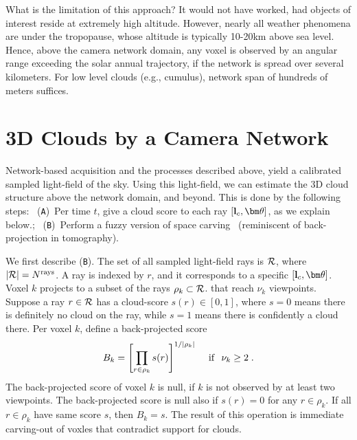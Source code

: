 \documentclass[runningheads]{llncs}
\begin{document}
What is the limitation of this approach? It would not have worked, had objects of interest reside at extremely high altitude. However, nearly all weather phenomena are under the tropopause, whose altitude is typically 10-20km above sea level. Hence, above the camera network domain, any voxel is observed by an angular range exceeding the solar annual trajectory, if the network is spread over several kilometers. For low level clouds (e.g., cumulus), network span of hundreds of meters suffices.


\section{3D Clouds by a Camera Network}
\label{sec:mutiradio}

Network-based acquisition and the processes described above, yield a calibrated sampled light-field of the sky. Using this light-field, we can estimate the 3D cloud structure above the network domain, and beyond. This is done by the following steps:~ %
({\tt A})~Per time $t$, give a {\rm cloud score} to each ray $[{\bf l}_c,{\bm \theta}]$, as we explain below.;~ ({\tt B})~Perform a fuzzy version of space carving~\cite{Kutulakos2000} (reminiscent of back-projection in tomography).

We first describe ({\tt B}).  The set of all sampled light-field rays is ${\cal R}$, where
\mbox{$|{\cal R}|=N^{\rm rays}$}. A ray is indexed by $r$, and it corresponds to a specific $[{\bf l}_c,{\bm \theta}]$. Voxel $k$ projects to a subset of the rays $\rho_k\subset{\cal R}$.
that reach $\nu_k$ viewpoints. Suppose a ray $r\in{\cal R}$ has a cloud-score $s(r)\in[0,1]$, where $s=0$ means there is definitely no cloud on the ray, while $s=1$ means there is confidently a cloud there. Per voxel $k$, define a back-projected score
\begin{equation}
 B_k= \left[ \prod_{r\in\rho_k} s(r)\right]^{1/|\rho_k|}
 \;\; ~~{\rm if}~~ \nu_k\geq 2
  \;.
 \label{eq:Bk}
\end{equation}
The back-projected score of voxel $k$ is null, if $k$ is not observed by at least two viewpoints. The back-projected score is null also if $s(r)=0$ for any $r\in\rho_k$. If all $r\in\rho_k$ have same score $s$, then $B_k=s$. The result of this operation is immediate carving-out of voxles that contradict  support for clouds.
\end{document}
